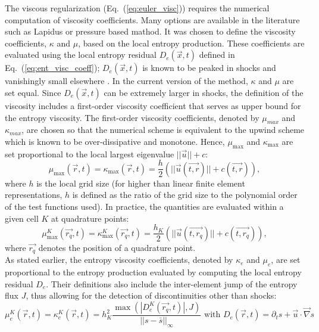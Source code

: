\documentclass[preprint,10pt]{elsarticle}
\newcommand{\grad}{\vec{\nabla}}
\newcommand{\eqt}[1]{Eq.~(\ref{#1})}                     %
\begin{document}
The viscous regularization (\eqt{eq:euler_visc}) requires the numerical computation of viscosity coefficients. Many options are available in the literature such as Lapidus or pressure based mathod. It was chosen to define the viscosity coefficients, $\kappa$ and $\mu$, based on the local entropy production. These coefficients are evaluated using the local entropy residual $D_e(\vec{x},t)$ defined in \eqt{eq:ent_visc_coeff}; $D_e(\vec{x},t)$ is known to be peaked in shocks and vanishingly small elsewhere \cite{Toro}. 
%
In the current version of the method, $\kappa$ and $\mu$ are set equal. Since $D_e(\vec{x},t)$ can be extremely larger in shocks, the definition of the viscosity includes a first-order viscosity coefficient that serves as upper bound for the entropy viscosity. The first-order viscosity coefficients, denoted by $\mu_{max}$ and $\kappa_{max}$, are chosen so that the numerical scheme is equivalent to the upwind scheme which is known to be over-dissipative and monotone\cite{Toro}.  Hence, $\mu_{\max}$ and $\kappa_{\max}$ are set proportional to the local largest eigenvalue $|| \vec{u} || + c $:
%
\begin{equation}
\label{eq:fo}
\mu_{\max}(\vec{r}, t) = \kappa_{\max}(\vec{r}, t) = \frac{h}{2} \left( || \vec{u}(\vec{t,r}) || + c(\vec{t,r}) \right),
\end{equation}
%
where $h$ is the local grid size (for higher than linear finite element representations, $h$ is defined as the ratio of the grid size to the polynomial order of the test functions used). In practice, the quantities are evaluated within a given cell $K$ at quadrature points:
%
\begin{equation}
\label{eq:fo_quad}
\mu^K_{\max}(\vec{r_q}, t) = \kappa^K_{\max}(\vec{r_q}, t) = \frac{h_K}{2} \left( || \vec{u}(\vec{t,r_q}) || + c(\vec{t,r_q}) \right),
\end{equation}
%
where $\vec{r_q}$ denotes the position of a quadrature point.\\
As stated earlier, the entropy viscosity coefficients, denoted by $\kappa_e$ and $\mu_e$, are set proportional to the entropy production evaluated by computing the local entropy residual $D_e$. Their definitions also include the inter-element jump of the entropy flux $J$, thus allowing for the detection of discontinuities other than shocks:
\begin{equation}
\label{eq:ent_visc_coeff}
\mu^K_e(\vec{r},t) = \kappa^K_e(\vec{r},t) = h_K^2 \frac{\max\left( | D^K_e(\vec{r_q},t) |, J \right)}{|| s - \bar{s} ||_{\infty}} \text{ with } D_e(\vec{r}, t) = \partial_t s + \vec{u} \cdot \grad s
\end{equation}
\end{document}
